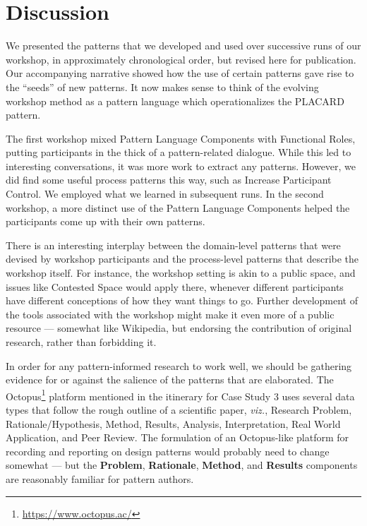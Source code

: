 \documentclass[acmlarge,timestamp]{acmart}
\begin{document}

\section{Discussion}

We presented the patterns that we developed and used over successive
runs of our workshop, in approximately chronological order, but
revised here for publication.  Our accompanying narrative showed how
the use of certain patterns gave rise to the ``seeds'' of new
patterns.  It now makes sense to think of the evolving workshop method
as a pattern language which operationalizes the PLACARD pattern.

The first workshop mixed {\sc Pattern Language Components} with {\sc
  Functional Roles}, putting participants in the thick of a
pattern-related dialogue.  While this led to interesting
conversations, it was more work to extract any patterns.  However, we
did find some useful process patterns this way, such as {\sc Increase
  Participant Control}.  We employed what we learned in subsequent
runs.  In the second workshop, a more distinct use of the {\sc Pattern
  Language Components} helped the participants come up with their own
patterns.

There is an interesting interplay between the domain-level patterns
that were devised by workshop participants and the process-level
patterns that describe the workshop itself.  For instance, the
workshop setting is akin to a public space, and issues like {\sc
  Contested Space} would apply there, whenever different participants
have different conceptions of how they want things to go.  Further
development of the tools associated with the workshop might make it
even more of a public resource — somewhat like Wikipedia, but
endorsing the contribution of original research, rather than
forbidding it.

In order for any pattern-informed research to work well, we should be gathering evidence for or against the salience of the patterns that are elaborated.  The Octopus\footnote{\url{https://www.octopus.ac/}} platform mentioned in the itinerary for Case Study 3 uses several data types that follow the rough outline of a scientific paper, \emph{viz.},
Research Problem,
Rationale/Hypothesis,
Method,
Results,
Analysis,
Interpretation,
Real World Application, and
Peer Review.
The formulation of an Octopus-like platform for recording and reporting on design patterns would probably need to change somewhat — but the \textbf{Problem}, \textbf{Rationale}, \textbf{Method}, and \textbf{Results} components are reasonably familiar for pattern authors.
\end{document}
